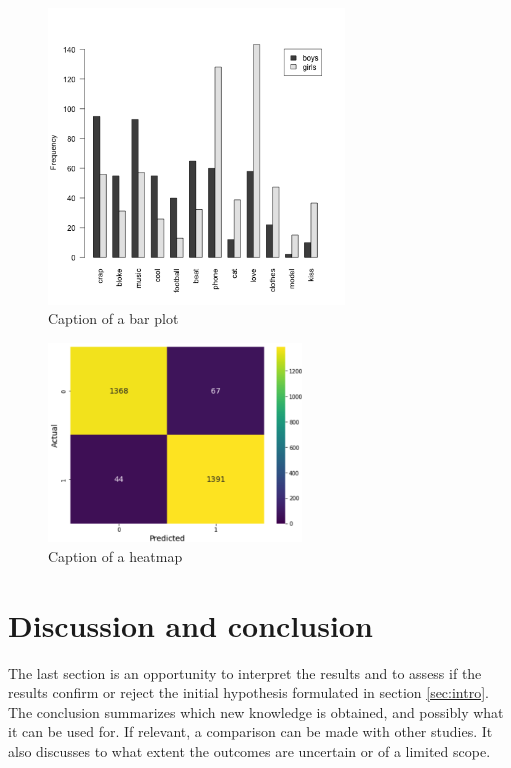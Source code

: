 \documentclass[a4paper,12pt]{article}
\begin{document}


\begin{figure}[htbp] \begin{center}
\includegraphics[width=0.7\textwidth]{boysgirls.png}
\caption{Caption of a bar plot} \label{fig:bp}
\end{center} \end{figure}

\begin{figure}[htbp] \begin{center}
\includegraphics[width=0.6\textwidth]{cm.png}
\caption{Caption of a heatmap} \label{fig:cm}
\end{center} \end{figure}

\section{Discussion and conclusion}
The last section is an opportunity to interpret the results and to assess if the results confirm or reject the initial hypothesis formulated in section \ref{sec:intro}.
The conclusion summarizes which new knowledge is obtained, and possibly what it can be used for.
If relevant, a comparison can be made with other studies.
It also discusses to what extent the outcomes are uncertain or of a limited scope.
\end{document}

